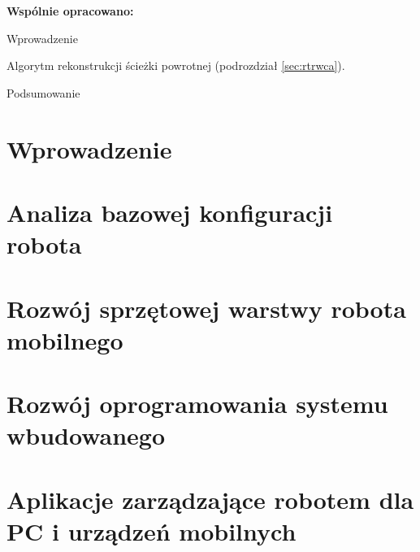 \documentclass[a4paper,12pt, oneside]{mwbk}
\newenvironment{item-list}
{\begin{itemize}
  \setlength{\itemsep}{0mm}
  \setlength{\parskip}{0pt}
  \setlength{\parsep}{1pt}}
{\end{itemize}}
\begin{document}
\textbf{Wspólnie opracowano:}
\begin{item-list}
  \item Wprowadzenie
  \item Algorytm rekonstrukcji ścieżki powrotnej (podrozdział \ref{sec:rtrwca}).
  \item Podsumowanie
\end{item-list}

\newpage
\tableofcontents

\newpage 
\chapter*{Wprowadzenie}



\newpage
\chapter{Analiza bazowej konfiguracji robota}
\label{ch:analysis}



\newpage
\chapter{Rozwój sprzętowej warstwy robota mobilnego}









\newpage
\chapter{Rozwój oprogramowania systemu wbudowanego}








\newpage
\chapter{Aplikacje zarządzające robotem dla PC i urządzeń mobilnych}




\end{document}
